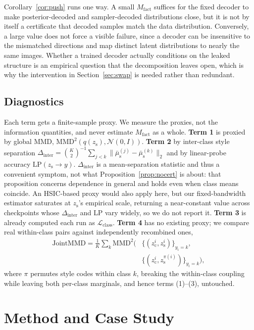 \documentclass[letterpaper]{article} %
\newcommand{\zc}{z_{\mathrm{c}}}
\newcommand{\zs}{z_{\mathrm{s}}}
\newcommand{\mus}{\mu_{\mathrm{s}}}
\newcommand{\MMD}{\mathrm{MMD}}
\newcommand{\Dinter}{\Delta_{\mathrm{inter}}}
\begin{document}
Corollary~\ref{cor:push} runs one way. A small $M_{\mathrm{fact}}$ suffices
for the fixed decoder to make posterior-decoded and sampler-decoded
distributions close, but it is not by itself a certificate that decoded
samples match the data distribution. Conversely, a large value does not force
a visible failure, since a decoder can be insensitive to the mismatched
directions and map distinct latent distributions to nearly the same images.
Whether a trained decoder actually conditions on the leaked structure is an
empirical question that
the decomposition leaves open, which is why the intervention in
Section~\ref{sec:swap} is needed rather than redundant.

\subsection{Diagnostics}
\label{sec:diag}

Each term gets a finite-sample proxy. We measure the proxies, not the
information quantities, and never estimate $M_{\mathrm{fact}}$ as a whole.
\textbf{Term 1} is proxied by global MMD, $\MMD^2(q(\zs),\mathcal N(0,I))$.
\textbf{Term 2} by inter-class style separation
$\Dinter=\binom{K}{2}^{-1}\sum_{j<k}\|\bar\mus^{(j)}-\bar\mus^{(k)}\|_2$ and
by linear-probe accuracy $\mathrm{LP}(\zs\to y)$. $\Dinter$ is a
mean-separation statistic and thus a convenient symptom, not what
Proposition~\ref{prop:nocert} is about: that proposition concerns dependence
in general and holds even when class means coincide. An HSIC-based proxy
would also apply here, but our fixed-bandwidth estimator saturates at $\zs$'s
empirical scale, returning a near-constant value across checkpoints whose
$\Dinter$ and LP vary widely, so we do not report it. \textbf{Term 3} is
already computed each run as $\mathcal L_{\mathrm{class}}$. \textbf{Term 4}
has no existing proxy; we compare real within-class pairs against
independently recombined ones,
\begin{equation}
\begin{split}
\mathrm{JointMMD} = \tfrac1K\textstyle\sum_k \MMD^2\bigl(&\{(\zc^i,\zs^i)\}_{y_i=k},\\
&\{(\zc^i,\zs^{\pi(i)})\}_{y_i=k}\bigr),
\end{split}
\label{eq:jmmd}
\end{equation}
where $\pi$ permutes style codes within class $k$, breaking the within-class
coupling while leaving both per-class marginals, and hence terms (1)--(3),
untouched.

\section{Method and Case Study}
\label{sec:method}
\end{document}

